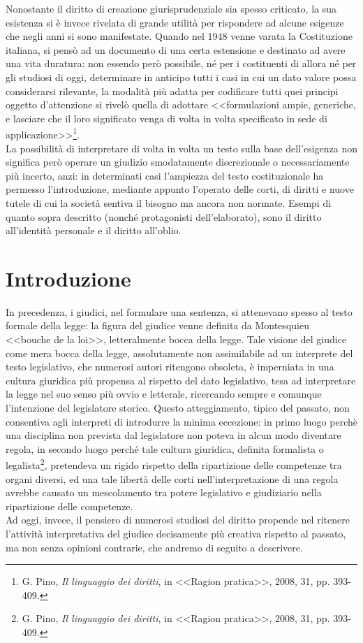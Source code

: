 Nonostante il diritto di creazione giurisprudenziale sia spesso criticato, la sua esistenza si è invece rivelata di grande utilità per rispondere ad alcune esigenze che negli anni si sono manifestate.
Quando nel 1948 venne varata la Costituzione italiana, si pensò ad un documento di una certa estensione e destinato ad avere una vita duratura: non essendo però possibile, né per i costituenti di allora né per gli studiosi di oggi, determinare in anticipo tutti i casi in cui un dato valore possa considerarsi rilevante, la modalità più adatta per codificare tutti quei principi oggetto d'attenzione si rivelò quella di adottare <<formulazioni ampie, generiche, e lasciare che il loro significato venga di volta in volta specificato in sede di applicazione>>\footnote{G. Pino, \textit{Il linguaggio dei diritti}, in <<Ragion pratica>>, 2008, 31, pp. 393-409.}.
\\La possibilità di interpretare di volta in volta un testo sulla base dell'esigenza non significa però operare un giudizio smodatamente discrezionale o necessariamente più incerto, anzi: in determinati casi l'ampiezza del testo costituzionale ha permesso l'introduzione, mediante appunto l'operato delle corti, di diritti e nuove tutele di cui la società sentiva il bisogno ma ancora non normate. Esempi di quanto sopra descritto (nonché protagonisti dell'elaborato), sono il diritto all'identità personale e il diritto all'oblio.

\section{Introduzione}
In precedenza, i giudici, nel formulare una sentenza, si attenevano spesso al testo formale della legge: la figura del giudice venne definita da Montesquieu <<bouche de la loi>>, letteralmente bocca della legge. 
Tale visione del giudice come mera bocca della legge, assolutamente non assimilabile ad un interprete del testo legislativo, che numerosi autori ritengono obsoleta, è imperniata in una cultura giuridica più propensa al rispetto del dato legislativo, tesa ad interpretare la legge nel suo senso più ovvio e letterale, ricercando sempre e comunque l’intenzione del legislatore storico. Questo atteggiamento, tipico del passato, non consentiva agli interpreti di introdurre la minima eccezione: in primo luogo perchè una disciplina non prevista dal legislatore non poteva in alcun modo diventare regola, in secondo luogo perché tale cultura giuridica, definita formalista o legalista\footnote{G. Pino, \textit{Il linguaggio dei diritti}, in <<Ragion pratica>>, 2008, 31, pp. 393-409.}, pretendeva un rigido rispetto della ripartizione delle competenze tra organi diversi, ed una tale libertà delle corti nell'interpretazione di una regola avrebbe causato un mescolamento tra potere legislativo e giudiziario nella ripartizione delle competenze.
\\Ad oggi, invece, il pensiero di numerosi studiosi del diritto propende nel ritenere l’attività interpretativa del giudice decisamente più creativa rispetto al passato, ma non senza opinioni contrarie, che andremo di seguito a descrivere.

